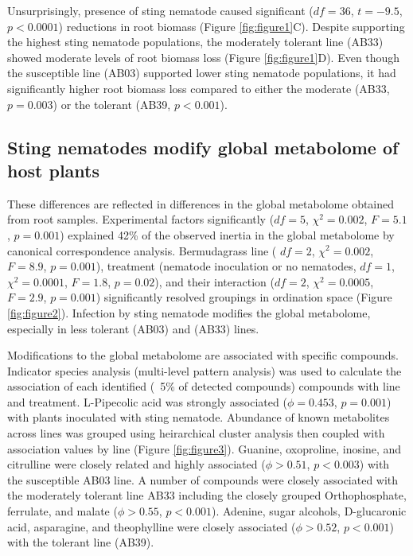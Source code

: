 \documentclass[9pt,lineno]{elife}
\begin{document}
Unsurprisingly, presence of sting nematode caused significant ($df = 36$, $t = -9.5$, $p < 0.0001$) reductions in root biomass (Figure \ref{fig:figure1}C).  Despite supporting the highest sting nematode populations, the moderately tolerant line (AB33) showed moderate levels of root biomass loss (Figure \ref{fig:figure1}D). Even though the susceptible line (AB03) supported lower sting nematode populations, it had significantly higher root biomass loss compared to either the moderate (AB33, $p = 0.003$) or the tolerant (AB39, $p < 0.001$).  

\subsection{Sting nematodes modify global metabolome of host plants}
These differences are reflected in differences in the global metabolome obtained from root samples.  Experimental factors significantly ($df = 5$, $\chi^2 = 0.002$, $F = 5.1$, $p = 0.001$) explained 42\% of the observed inertia in the global metabolome by canonical correspondence analysis.  Bermudagrass line ( $df = 2$, $\chi^2 = 0.002$, $F = 8.9$, $p = 0.001$), treatment (nematode inoculation or no nematodes, $df = 1$, $\chi^2 = 0.0001$, $F = 1.8$, $p = 0.02$), and their interaction ($df = 2$, $\chi^2 = 0.0005$, $F = 2.9$, $p = 0.001$) significantly resolved groupings in ordination space (Figure \ref{fig:figure2}).  Infection by sting nematode modifies the global metabolome, especially in less tolerant (AB03) and (AB33) lines.

Modifications to the global metabolome are associated with specific compounds.  Indicator species analysis (multi-level pattern analysis) was used to calculate the association of each identified (~5\% of detected compounds) compounds with line and treatment.  L-Pipecolic acid was strongly associated ($\phi = 0.453$, $p = 0.001$) with plants inoculated with sting nematode.  Abundance of known metabolites across lines was grouped using heirarchical cluster analysis then coupled with association values by line (Figure \ref{fig:figure3}).  Guanine, oxoproline, inosine, and citrulline were closely related and highly associated ($\phi >0.51$, $p < 0.003$) with the susceptible AB03 line.  A number of compounds were closely associated with the moderately tolerant line AB33 including the closely grouped Orthophosphate, ferrulate, and malate ($\phi > 0.55$, $p < 0.001$). Adenine, sugar alcohols, D-glucaronic acid, asparagine, and theophylline were closely associated ($\phi > 0.52$, $p < 0.001$) with the tolerant line (AB39).  
\end{document}
